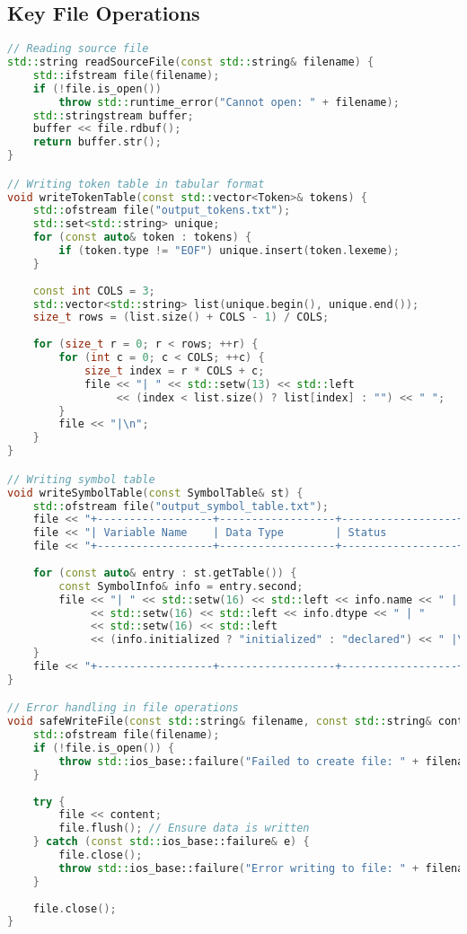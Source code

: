 \documentclass[12pt,a4paper]{article}
\begin{document}
\subsection{Key File Operations}

\begin{lstlisting}[language=C++, caption=Essential File Operations in Banglish Compiler]
// Reading source file
std::string readSourceFile(const std::string& filename) {
    std::ifstream file(filename);
    if (!file.is_open()) 
        throw std::runtime_error("Cannot open: " + filename);
    std::stringstream buffer;
    buffer << file.rdbuf();
    return buffer.str();
}

// Writing token table in tabular format
void writeTokenTable(const std::vector<Token>& tokens) {
    std::ofstream file("output_tokens.txt");
    std::set<std::string> unique;
    for (const auto& token : tokens) {
        if (token.type != "EOF") unique.insert(token.lexeme);
    }
    
    const int COLS = 3;
    std::vector<std::string> list(unique.begin(), unique.end());
    size_t rows = (list.size() + COLS - 1) / COLS;
    
    for (size_t r = 0; r < rows; ++r) {
        for (int c = 0; c < COLS; ++c) {
            size_t index = r * COLS + c;
            file << "| " << std::setw(13) << std::left 
                 << (index < list.size() ? list[index] : "") << " ";
        }
        file << "|\n";
    }
}

// Writing symbol table
void writeSymbolTable(const SymbolTable& st) {
    std::ofstream file("output_symbol_table.txt");
    file << "+------------------+------------------+------------------+\n";
    file << "| Variable Name    | Data Type        | Status           |\n";
    file << "+------------------+------------------+------------------+\n";
    
    for (const auto& entry : st.getTable()) {
        const SymbolInfo& info = entry.second;
        file << "| " << std::setw(16) << std::left << info.name << " | "
             << std::setw(16) << std::left << info.dtype << " | "
             << std::setw(16) << std::left 
             << (info.initialized ? "initialized" : "declared") << " |\n";
    }
    file << "+------------------+------------------+------------------+\n";
}

// Error handling in file operations
void safeWriteFile(const std::string& filename, const std::string& content) {
    std::ofstream file(filename);
    if (!file.is_open()) {
        throw std::ios_base::failure("Failed to create file: " + filename);
    }
    
    try {
        file << content;
        file.flush(); // Ensure data is written
    } catch (const std::ios_base::failure& e) {
        file.close();
        throw std::ios_base::failure("Error writing to file: " + filename);
    }
    
    file.close();
}
\end{lstlisting}
\end{document}
